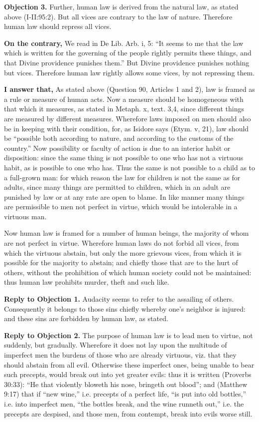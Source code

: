 \textbf{Objection 3.} Further, human law is derived from the natural law, as stated above (I-II:95:2). But all vices are contrary to the law of nature. Therefore human law should repress all vices.

\textbf{On the contrary,} We read in De Lib. Arb. i, 5: ``It seems to me that the law which is written for the governing of the people rightly permits these things, and that Divine providence punishes them.'' But Divine providence punishes nothing but vices. Therefore human law rightly allows some vices, by not repressing them.

\textbf{I answer that,} As stated above (Question 90, Articles 1 and 2), law is framed as a rule or measure of human acts. Now a measure should be homogeneous with that which it measures, as stated in Metaph. x, text. 3,4, since different things are measured by different measures. Wherefore laws imposed on men should also be in keeping with their condition, for, as Isidore says (Etym. v, 21), law should be ``possible both according to nature, and according to the customs of the country.'' Now possibility or faculty of action is due to an interior habit or disposition: since the same thing is not possible to one who has not a virtuous habit, as is possible to one who has. Thus the same is not possible to a child as to a full-grown man: for which reason the law for children is not the same as for adults, since many things are permitted to children, which in an adult are punished by law or at any rate are open to blame. In like manner many things are permissible to men not perfect in virtue, which would be intolerable in a virtuous man.

Now human law is framed for a number of human beings, the majority of whom are not perfect in virtue. Wherefore human laws do not forbid all vices, from which the virtuous abstain, but only the more grievous vices, from which it is possible for the majority to abstain; and chiefly those that are to the hurt of others, without the prohibition of which human society could not be maintained: thus human law prohibits murder, theft and such like.

\textbf{Reply to Objection 1.} Audacity seems to refer to the assailing of others. Consequently it belongs to those sins chiefly whereby one's neighbor is injured: and these sins are forbidden by human law, as stated.

\textbf{Reply to Objection 2.} The purpose of human law is to lead men to virtue, not suddenly, but gradually. Wherefore it does not lay upon the multitude of imperfect men the burdens of those who are already virtuous, viz. that they should abstain from all evil. Otherwise these imperfect ones, being unable to bear such precepts, would break out into yet greater evils: thus it is written (Proverbs 30:33): ``He that violently bloweth his nose, bringeth out blood''; and (Matthew 9:17) that if ``new wine,'' i.e. precepts of a perfect life, ``is put into old bottles,'' i.e. into imperfect men, ``the bottles break, and the wine runneth out,'' i.e. the precepts are despised, and those men, from contempt, break into evils worse still.

